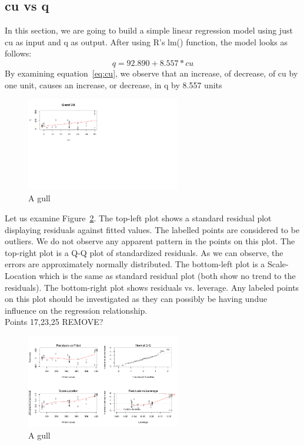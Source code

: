 \documentclass[a4paper,12pt, english]{article}
\begin{document}
\subsection{cu vs q} 
In this section, we are going to build a simple linear regression model using just cu as input and q as output. After using R's lm() function, the model looks as follows:\\
\begin{equation}
\label{eq:cu}
q = 92.890    +    8.557*cu 
\end{equation}       
By examining equation~\ref{eq:cu}, we observe that an increase, of decrease, of cu by one unit, causes an increase, or decrease, in q by 8.557 units
\begin{figure}[h!]
  \centering
  \includegraphics[width=0.6\textwidth]{cu-line}
  \caption{A gull}
  \label{fig:cu-line}
\end{figure}

Let us examine Figure~\ref{fig:cu-goodness}. The top-left plot shows a standard residual plot displaying residuals against fitted values. The labelled points are considered to be outliers. We do not observe any apparent pattern in the points on this plot. The top-right plot is a Q-Q plot of standardized residuals. As we can observe, the errors are approximately normally distributed. The bottom-left plot is a Scale-Location which is the same as standard residual plot (both show no trend to the residuals). The bottom-right plot shows residuals vs. leverage. Any labeled points on this plot should be investigated as they can possibly be having undue influence on the regression relationship.\\
Points 17,23,25 REMOVE?


\begin{figure}[h!]
  \centering
  \includegraphics[width=0.6\textwidth]{cu-goodness}
  \caption{A gull}
  \label{fig:cu-goodness}
\end{figure}




\end{document}
